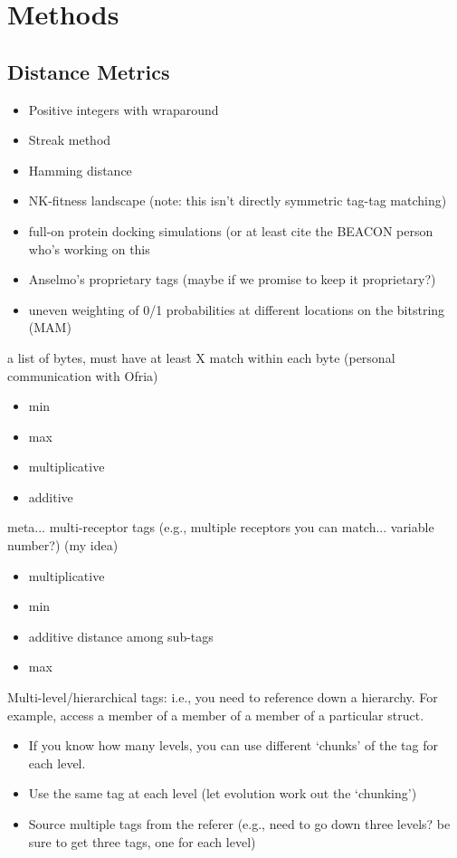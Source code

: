\section{Methods}

\subsection{Distance Metrics}

\begin{itemize}
\item Positive integers with wraparound \citep{spector2011tag}
\item Streak method \citep{downing2015intelligence}
\item Hamming distance \citep{lalejini2019else}
\item NK-fitness landscape \citep{kauffman1987towards} (note: this isn't directly symmetric tag-tag matching)
\item full-on protein docking simulations (or at least cite the BEACON person who's working on this
\item Anselmo's proprietary tags (maybe if we promise to keep it proprietary?)
\item uneven weighting of 0/1 probabilities at different locations on the bitstring (MAM)
\end{itemize}

a list of bytes, must have at least X match within each byte (personal communication with Ofria)
\begin{itemize}
\item min
\item max
\item multiplicative
\item additive
\end{itemize}

meta... multi-receptor tags (e.g., multiple receptors you can match... variable number?) (my idea)
\begin{itemize}
\item multiplicative
\item min
\item additive distance among sub-tags
\item max
\end{itemize}

Multi-level/hierarchical tags: i.e., you need to reference down a hierarchy. For
example, access a member of a member of a member of a particular struct.
\begin{itemize}
  \item If you know how many levels, you can use different `chunks' of the tag for
        each level.
  \item Use the same tag at each level (let evolution work out the `chunking')
  \item Source multiple tags from the referer (e.g., need to go down three levels?
    be sure to get three tags, one for each level)
\end{itemize}

